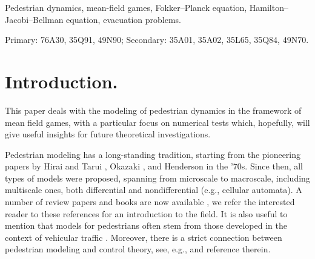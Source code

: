\documentclass{cmslatex}
\begin{document}
\begin{keywords}
Pedestrian dynamics, mean-field games, Fokker--Planck equation, Hamilton--Jacobi--Bellman equation, evacuation problems.
\end{keywords}

\begin{AMS}
Primary: 76A30, 35Q91, 49N90; Secondary: 35A01, 35A02, 35L65, 35Q84, 49N70.
\end{AMS}


\section{Introduction.}\label{sec:intro}	
This paper deals with the modeling of pedestrian dynamics in the framework of mean field games, with a particular focus on numerical tests which, hopefully, will give useful insights for future theoretical investigations.

Pedestrian modeling has a long-standing tradition, starting from the pioneering papers by Hirai and Tarui \cite{hirai1975}, Okazaki \cite{okazaki1979TAIJa}, and Henderson \cite{henderson1974} in the '70s.
Since then, all types of models were proposed, spanning from microscale to macroscale, including multiscale ones, both differential and nondifferential (e.g., cellular automata). A number of review papers and books are now available \cite{aghamohammadi2020, 
	bellomo2011,
	cristiani2014book, 
	dong2020, 
	duives2013,
	eftimie2018,
	haghani2020, 
	martinez2017,
    papadimitriou2009,
    rosini2013book}, 
we refer the interested reader to these references for an introduction to the field. 
It is also useful to mention that models for pedestrians often stem from those developed in the context of vehicular traffic \cite{helbing2001, rosini2013book}.
Moreover, there is a strict connection between pedestrian modeling and control theory, see, e.g., \cite{albi2020, cristiani2014book} and reference therein.
\end{document}
